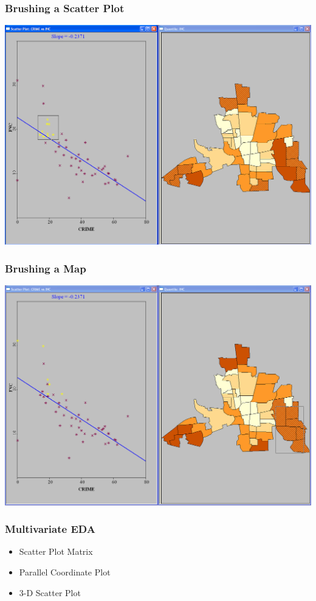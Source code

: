 \documentclass[nototal,handout]{beamer}
\begin{document}
\begin{frame}
	\frametitle{Brushing a  Scatter Plot}
 \begin{center}
 \includegraphics[width=.85\linewidth]{brushspgeoda.png}
  \end{center}
 \end{frame} 

\begin{frame}
	\frametitle{Brushing a  Map}
 \begin{center}
 \includegraphics[width=.85\linewidth]{brushmapgeoda.png}
  \end{center}
 \end{frame} 

\begin{frame}
	\frametitle{Multivariate EDA}
 \begin{itemize}
 \item  Scatter Plot Matrix
 \item  Parallel Coordinate Plot
 \item  3-D Scatter Plot
 \end{itemize}
 \end{frame} 
\end{document}
